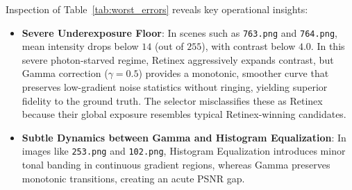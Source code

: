 \documentclass[journal]{IEEEtran}
\begin{document}
\begin{table}[!t]
\centering
\caption{Ten Largest Regret Instances in the Training Corpus}
\label{tab:worst_errors}
\end{table}

Inspection of Table~\ref{tab:worst_errors} reveals key operational insights:
\begin{itemize}
    \item \textbf{Severe Underexposure Floor}: In scenes such as \texttt{763.png} and \texttt{764.png}, mean intensity drops below $14$ (out of $255$), with contrast below $4.0$. In this severe photon-starved regime, Retinex aggressively expands contrast, but Gamma correction ($\gamma = 0.5$) provides a monotonic, smoother curve that preserves low-gradient noise statistics without ringing, yielding superior fidelity to the ground truth. The selector misclassifies these as Retinex because their global exposure resembles typical Retinex-winning candidates.
    \item \textbf{Subtle Dynamics between Gamma and Histogram Equalization}: In images like \texttt{253.png} and \texttt{102.png}, Histogram Equalization introduces minor tonal banding in continuous gradient regions, whereas Gamma preserves monotonic transitions, creating an acute PSNR gap.
\end{itemize}
\end{document}
